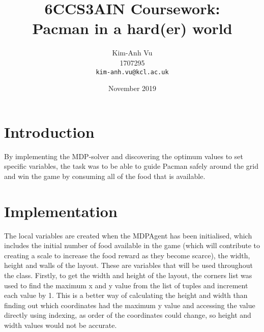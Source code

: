 \documentclass[12pt]{report}
\title{6CCS3AIN Coursework: \\ Pacman in a hard(er) world}
\author{
  Kim-Anh Vu\\1707295\\
  \texttt{kim-anh.vu@kcl.ac.uk}
}
\date{November 2019}
\begin{document}
  \begin{titlepage}
    \maketitle
  \end{titlepage}
  \section*{Introduction}
    By implementing the MDP-solver and discovering the optimum values to set specific
    variables, the task was to be able to guide Pacman safely around the grid and
    win the game by consuming all of the food that is available.
    \vspace{-5mm}
    \section*{Implementation}
      The local variables are created when the MDPAgent has been initialised, which includes the initial number of food available in the game (which will contribute to creating a scale to increase the food reward as they become scarce), the width, height and walls of the layout. These are variables that will be used throughout the class.
      \newline \newline
      Firstly, to get the width and height of the layout, the corners list was used to find the maximum x and y value from the list of tuples and increment each value by 1. This is a better way of calculating the height and width than finding out which coordinates had the maximum y value and accessing the value directly using indexing, as order of the coordinates could change, so height and width values would not be accurate.
      \vspace{-5mm}
\end{document}
